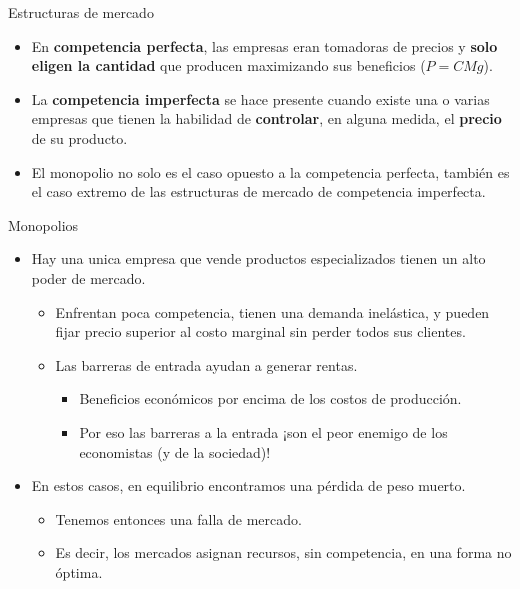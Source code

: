 \documentclass{beamer}
\begin{document}
\begin{frame}{Estructuras de mercado}
      \begin{itemize} 
        \item En \textbf{competencia perfecta}, las empresas eran tomadoras de precios y \textbf{solo eligen la cantidad} que producen maximizando sus beneficios ($P=CMg$). \vspace{1mm}
        \item La \textbf{competencia imperfecta} se hace presente cuando existe una o varias empresas que tienen la habilidad de \textbf{controlar}, en alguna medida, el \textbf{precio} de su producto. \vspace{1mm}
        \item El monopolio no solo es el caso opuesto a la competencia perfecta, también es el caso extremo de las estructuras de mercado de competencia imperfecta. \vspace{1mm}
      \end{itemize} 
\end{frame}

\begin{frame}{Monopolios}
    \begin{itemize}
        \item Hay una unica empresa que vende productos especializados tienen un alto poder de mercado.
        \begin{itemize}
            \item Enfrentan poca competencia, tienen una demanda inelástica, y pueden fijar precio superior al costo marginal sin perder todos sus clientes.
            \item Las barreras de entrada ayudan a generar rentas.
            \begin{itemize}
                \item Beneficios económicos por encima de los costos de producción.
                \item Por eso las barreras a la entrada ¡son el peor enemigo de los economistas (y de la sociedad)!
            \end{itemize}
        \end{itemize}
        \item En estos casos, en equilibrio encontramos una pérdida de peso muerto.
        \begin{itemize}
            \item Tenemos entonces una falla de mercado.
            \item Es decir, los mercados asignan recursos, sin competencia, en una forma no óptima.
        \end{itemize}
    \end{itemize}
\end{frame}
\end{document}
